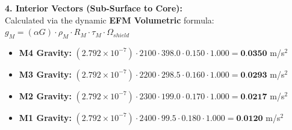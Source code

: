 \documentclass[11pt, a4paper]{article}
\begin{document}
  \vspace{0.5em}
  \noindent \textbf{4. Interior Vectors (Sub-Surface to Core):} \\[0.5em]
  \hspace*{1em} Calculated via the dynamic \textbf{EFM Volumetric} formula: $g_M = (\alpha G) \cdot \rho_{M} \cdot R_M \cdot \tau_M \cdot \Omega_{shield}$
  \begin{itemize}
    \item \textbf{M4 Gravity:} $(2.792 \times 10^{-7}) \cdot 2100 \cdot 398.0 \cdot 0.150 \cdot 1.000 = \textbf{0.0350}$ m/s$^2$
    \item \textbf{M3 Gravity:} $(2.792 \times 10^{-7}) \cdot 2200 \cdot 298.5 \cdot 0.160 \cdot 1.000 = \textbf{0.0293}$ m/s$^2$
    \item \textbf{M2 Gravity:} $(2.792 \times 10^{-7}) \cdot 2300 \cdot 199.0 \cdot 0.170 \cdot 1.000 = \textbf{0.0217}$ m/s$^2$
    \item \textbf{M1 Gravity:} $(2.792 \times 10^{-7}) \cdot 2400 \cdot 99.5 \cdot 0.180 \cdot 1.000 = \textbf{0.0120}$ m/s$^2$
  \end{itemize}
\end{document}
